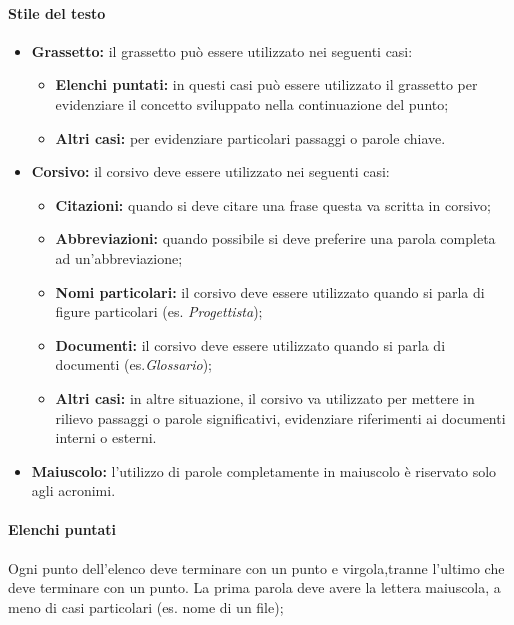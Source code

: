 		\paragraph{Stile del testo}
		\begin{itemize}
		\item \textbf{Grassetto:} il grassetto può essere utilizzato nei seguenti casi:
			\begin{itemize}
			\item \textbf{Elenchi puntati:} in questi casi può essere utilizzato il grassetto per evidenziare il concetto sviluppato nella continuazione del punto;
			\item \textbf{Altri casi:} per evidenziare particolari passaggi o parole chiave.
			\end{itemize}
		
		\item \textbf{Corsivo:} il corsivo deve essere utilizzato nei seguenti casi:
			\begin{itemize}
				\item \textbf{Citazioni:} quando si deve citare una frase questa va scritta in corsivo;
				\item \textbf{Abbreviazioni:} quando possibile si deve preferire una parola completa ad un’abbreviazione;
				\item \textbf{Nomi particolari:} il corsivo deve essere utilizzato quando si parla di figure particolari (es. \textit{Progettista});
				\item \textbf{Documenti:} il corsivo deve essere utilizzato quando si parla di documenti (es.\textit{Glossario});
				\item \textbf{Altri casi:} in altre situazione, il corsivo va utilizzato per mettere in rilievo passaggi o parole significativi, evidenziare riferimenti ai documenti interni o esterni.
			\end{itemize}
		
		\item \textbf{Maiuscolo:} l’utilizzo di parole completamente in maiuscolo è riservato solo agli acronimi.
		
		\end{itemize}
		
		\paragraph{Elenchi puntati} \Spazio
		Ogni punto dell’elenco deve terminare con un punto e virgola,tranne l’ultimo che deve terminare con un punto. La prima parola deve avere la lettera maiuscola, a meno di casi particolari (es. nome di un file);
		
